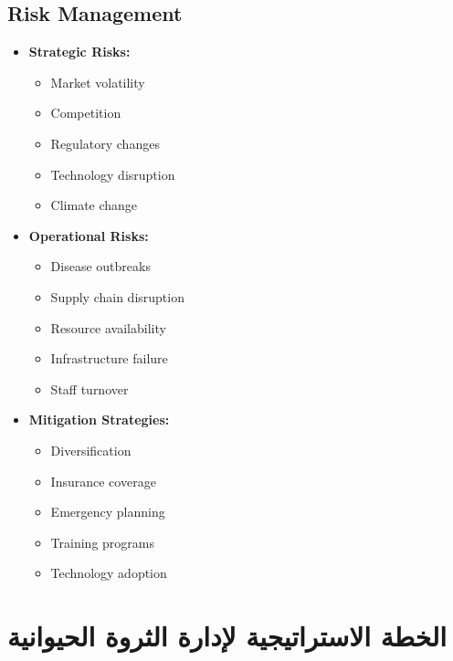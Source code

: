\subsection{Risk Management}
\begin{itemize}
    \item \textbf{Strategic Risks:}
    \begin{itemize}
        \item Market volatility
        \item Competition
        \item Regulatory changes
        \item Technology disruption
        \item Climate change
    \end{itemize}
    
    \item \textbf{Operational Risks:}
    \begin{itemize}
        \item Disease outbreaks
        \item Supply chain disruption
        \item Resource availability
        \item Infrastructure failure
        \item Staff turnover
    \end{itemize}
    
    \item \textbf{Mitigation Strategies:}
    \begin{itemize}
        \item Diversification
        \item Insurance coverage
        \item Emergency planning
        \item Training programs
        \item Technology adoption
    \end{itemize}
\end{itemize}

\section{الخطة الاستراتيجية لإدارة الثروة الحيوانية}

